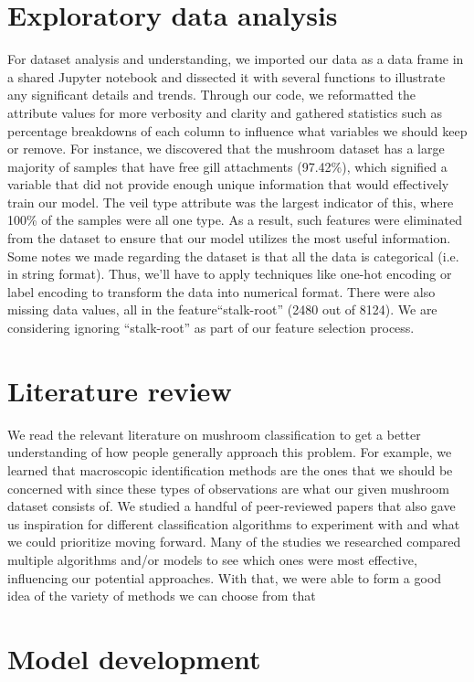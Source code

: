 \documentclass[twocolumn, 11pt]{article} \linespread{1}
\begin{document}
\section*{Exploratory data analysis}
    For dataset analysis and understanding, we imported our data as a data frame in a shared Jupyter notebook and dissected it with several functions to illustrate any significant details and trends. Through our code, we reformatted the attribute values for more verbosity and clarity and gathered statistics such as percentage breakdowns of each column to influence what variables we should keep or remove. For instance, we discovered that the mushroom dataset has a large majority of samples that have free gill attachments (97.42\%), which signified a variable that did not provide enough unique information that would effectively train our model. The veil type attribute was the largest indicator of this, where 100\% of the samples were all one type. As a result, such features were eliminated from the dataset to ensure that our model utilizes the most useful information. Some notes we made regarding the dataset is that all the data is categorical (i.e. in string format). Thus, we’ll have to apply techniques like one-hot encoding or label encoding to transform the data into numerical format. There were also missing data values, all in the feature“stalk-root” (2480 out of 8124). We are considering ignoring “stalk-root” as part of our feature selection process.

\section*{Literature review}
    We read the relevant literature on mushroom classification to get a better understanding of how people generally approach this problem. For example, we learned that macroscopic identification methods are the ones that we should be concerned with since these types of observations are what our given mushroom dataset consists of. We studied a handful of peer-reviewed papers that also gave us inspiration for different classification algorithms to experiment with and what we could prioritize moving forward. Many of the studies we researched compared multiple algorithms and/or models to see which ones were most effective, influencing our potential approaches. With that, we were able to form a good idea of the variety of methods we can choose from that

\section*{Model development}
\end{document}
